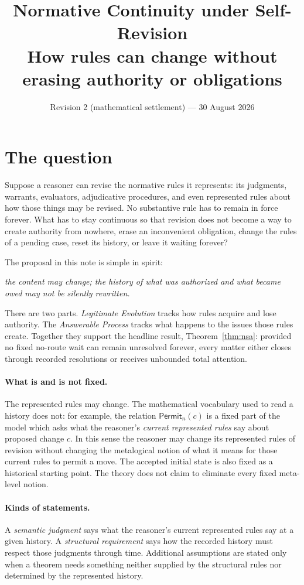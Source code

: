 \documentclass[11pt]{article}
\title{Normative Continuity under Self-Revision\\[3pt]
\large How rules can change without erasing authority or obligations}
\author{}
\date{Revision 2 (mathematical settlement) --- 30 August 2026}
\theoremstyle{definition}
\theoremstyle{remark}
\newcommand{\Permit}{\mathsf{Permit}}
\begin{document}
\maketitle

\section*{The question}

Suppose a reasoner can revise the normative rules it represents: its judgments,
warrants, evaluators, adjudicative procedures, and even represented rules about
how those things may be revised. No substantive rule has to remain in force
forever. What has to stay continuous so that revision does not become a way to
create authority from nowhere, erase an inconvenient obligation, change the
rules of a pending case, reset its history, or leave it waiting forever?

The proposal in this note is simple in spirit:
\begin{center}
\emph{the content may change; the history of what was authorized and what became owed may not be silently rewritten.}
\end{center}

There are two parts. \emph{Legitimate Evolution} tracks how rules acquire and
lose authority. The \emph{Answerable Process} tracks what happens to the issues
those rules create. Together they support the headline result, Theorem~\ref{thm:nsa}:
provided no fixed no-route wait can remain unresolved forever, every matter
either closes through recorded resolutions or receives unbounded total
attention.

\paragraph{What is and is not fixed.}
The represented rules may change. The mathematical vocabulary used to read a
history does not: for example, the relation $\Permit_n(c)$ is a fixed part of
the model which asks what the reasoner's \emph{current represented rules} say
about proposed change $c$. In this sense the reasoner may change its represented
rules of revision without changing the metalogical notion of what it means for
those current rules to permit a move. The accepted initial state is also fixed
as a historical starting point. The theory does not claim to eliminate every
fixed meta-level notion.

\paragraph{Kinds of statements.}
A \emph{semantic judgment} says what the reasoner's current represented rules
say at a given history. A \emph{structural requirement} says how the recorded
history must respect those judgments through time. Additional assumptions are
stated only when a theorem needs something neither supplied by the structural
rules nor determined by the represented history.
\end{document}
